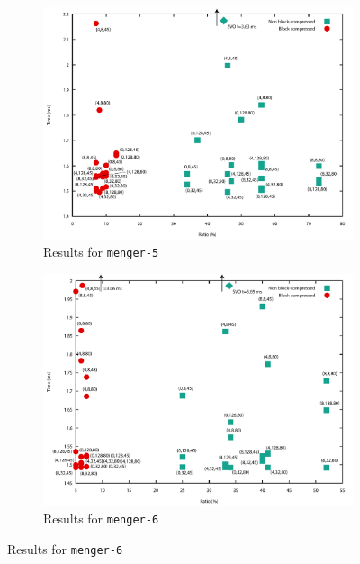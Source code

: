 \clearpage
\begin{figure}
\ContinuedFloat %
\begin{subfigure}{\textwidth}
\centering
    \includegraphics[width=\textwidth]{results/menger-5-ratio.pdf} 
    \caption{Results for \texttt{menger-5}}
    \label{fig:menger-5-ratio}
\end{subfigure}

\begin{subfigure}{\textwidth}
\centering
    \includegraphics[width=\textwidth]{results/menger-6-ratio.pdf} 
    \caption{Results for \texttt{menger-6}}
    \label{fig:menger-6-ratio}
\end{subfigure}

\label{fig:results-time-ratio}
\end{figure}

